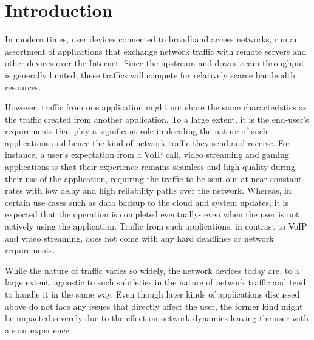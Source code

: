 \section{Introduction}
\label{sec:introduction}

In modern times, user devices connected to broadband access networks, run an assortment of applications that exchange network traffic with remote servers and other devices over the Internet. Since the upstream and downstream throughput is generally limited, these traffics will compete for relatively scarce bandwidth resources. 

However, traffic from one application might not share the same characteristics as the traffic created from another application. To a large extent, it is the end-user’s requirements that play a significant role in deciding the nature of such applications and hence the kind of network traffic they send and receive. For instance, a user’s expectation from a VoIP call, video streaming and gaming applications is that their experience remains seamless and high quality during their use of the application, requiring the traffic to be sent out at near constant rates with low delay and high reliability paths over the network. Whereas, in certain use cases such as data backup to the cloud and system updates, it is expected that the operation is completed eventually- even when the user is not actively using the application. Traffic from such applications, in contrast to VoIP and video streaming, does not come with any hard deadlines or network requirements.

While the nature of traffic varies so widely, the network devices today are, to a large extent, agnostic to such subtleties in the nature of network traffic and tend to handle it in the same way. Even though later kinds of applications discussed above do not face any issues that directly affect the user, the former kind might be impacted severely due to the effect on network dynamics leaving the user with a sour experience. 

